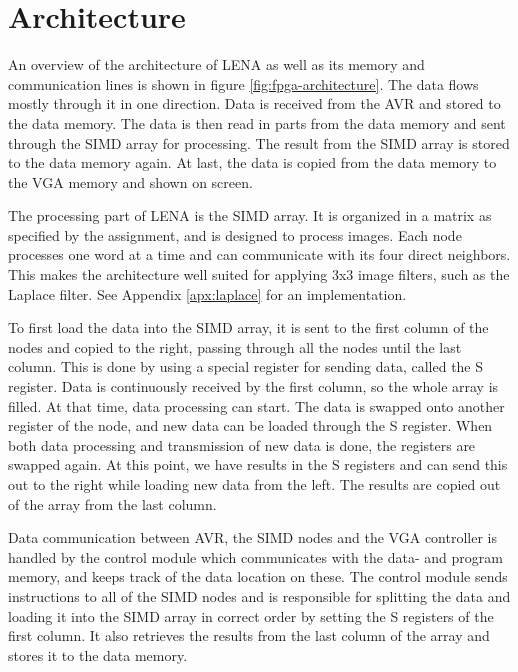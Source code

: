 \section{Architecture}



An overview of the architecture of \ac{LENA} as well as its memory and
communication lines is shown in figure \ref{fig:fpga-architecture}. The data
flows mostly through it in one direction. Data is received from the AVR and
stored to the data memory. The data is then read in parts from the data memory
and sent through the \ac{SIMD} array for processing. The result from the
\ac{SIMD} array is stored to the data memory again.  At last, the data is copied
from the data memory to the \ac{VGA} memory and shown on screen.

The processing part of \ac{LENA} is the \ac{SIMD} array. It is organized in a
matrix as specified by the assignment, and is designed to process images. Each
node processes one word at a time and can communicate with its four direct
neighbors. This makes the architecture well suited for applying 3x3 image
filters, such as the Laplace filter. See Appendix \ref{apx:laplace} for an
implementation. 

To first load the data into the \ac{SIMD} array, it is sent to the first column
of the nodes and copied to the right, passing through all the nodes until the
last column.  This is done by using a special register for sending data, called
the S register. Data is continuously
received by the first column, so the whole array is filled. At that time, data
processing can start. The data is swapped onto another register of the node, and
new data can be loaded through the S register.  When both data processing and
transmission of new data is done, the registers are swapped again. At this
point, we have results in the S registers and can send this out to the right
while loading new data from the left. The results are copied out of the array
from the last column.

Data communication between AVR, the \ac{SIMD} nodes and the \ac{VGA}
controller is handled by the control module which communicates with the data-
and program memory, and keeps track of the data location on these. The control
module sends instructions to all of the \ac{SIMD} nodes and is responsible for
splitting the data and loading it into the \ac{SIMD} array in correct order by
setting the S registers of the first column. It also retrieves the results from
the last column of the array and stores it to the data memory.

